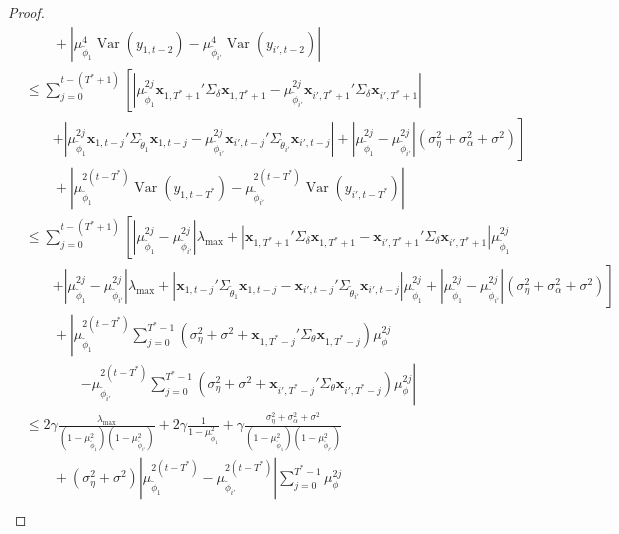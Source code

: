\documentclass[11pt]{article}
\newcommand{\x}{\textbf{x}}
\DeclareMathOperator{\Var}{Var} %
\theoremstyle{definition}
\begin{document}
\begin{proof}
\begin{align*}
   &\qquad + \left\vert \mu_{\tilde\phi_1}^4\Var(y_{1,t-2}) - \mu_{\tilde\phi_{i'}}^4\Var(y_{i',t-2}) \right\vert \\
   &\leq \sum_{j=0}^{t - (T^* + 1)}\left[ \left\vert \mu_{\tilde\phi_1}^{2j}\x_{1,T^*+1}'\Sigma_\delta\x_{1,T^*+1} - \mu_{\tilde\phi_{i'}}^{2j}\x_{i',T^*+1}'\Sigma_\delta\x_{i',T^*+1}\right\vert \right. \\
   &\qquad\left. + \left\vert \mu_{\tilde\phi_1}^{2j}\x_{1,t-j}'\Sigma_{\tilde\theta_1}\x_{1,t-j} - \mu_{\tilde\phi_{i'}}^{2j}\x_{i',t-j}'\Sigma_{\tilde\theta_{i'}}\x_{i',t-j} \right\vert + \left\vert\mu_{\tilde\phi_1}^{2j} - \mu_{\tilde\phi_{i'}}^{2j}\right\vert(\sigma^2_\eta + \sigma^2_{\alpha}+ \sigma^2)\right] \\
   &\qquad + \left\vert \mu_{\tilde\phi_1}^{2(t - T^*)}\Var(y_{1,t - T^*}) - \mu_{\tilde\phi_{i'}}^{2(t - T^*)}\Var(y_{i',t - T^*}) \right\vert \\
   &\leq \sum_{j=0}^{t - (T^* + 1)}\left[ \left\vert \mu_{\tilde\phi_1}^{2j} - \mu_{\tilde\phi_{i'}}^{2j}\right\vert \lambda_{\text{max}} +  \left\vert\x_{1,T^*+1}'\Sigma_\delta\x_{1,T^*+1} - \x_{i',T^*+1}'\Sigma_\delta\x_{i',T^*+1}\right\vert\mu_{\tilde\phi_1}^{2j} \right. \\
   &\qquad\left. + \left\vert \mu_{\tilde\phi_1}^{2j} - \mu_{\tilde\phi_{i'}}^{2j}\right\vert \lambda_{\text{max}} +  \left\vert\x_{1,t-j}'\Sigma_{\tilde\theta_1}\x_{1,t-j} - \x_{i',t-j}'\Sigma_{\tilde\theta_{i'}}\x_{i',t-j}\right\vert\mu_{\tilde\phi_1}^{2j} + \left\vert\mu_{\tilde\phi_1}^{2j} - \mu_{\tilde\phi_{i'}}^{2j}\right\vert(\sigma^2_\eta + \sigma^2_{\alpha}+ \sigma^2)\right] \\
   &\qquad + \left\vert \mu_{\tilde\phi_1}^{2(t - T^*)}\sum_{j=0}^{T^*-1}\left(\sigma^2_\eta + \sigma^2 + \x_{1,T^*-j}'\Sigma_\theta\x_{1,T^*-j}\right)\mu_{\phi}^{2j} \right. \\ 
   &\qquad\qquad\left. - \mu_{\tilde\phi_{i'}}^{2(t - T^*)}\sum_{j=0}^{T^*-1}\left(\sigma^2_\eta + \sigma^2 + \x_{i',T^*-j}'\Sigma_\theta\x_{i',T^*-j}\right)\mu_{\phi}^{2j} \right\vert \\
   &\leq 2\gamma\frac{\lambda_{\max}}{(1 - \mu_{\tilde\phi_1}^{2})(1 - \mu_{\tilde\phi_{i'}}^{2})} + 2\gamma\frac{1}{1 - \mu_{\tilde\phi_1}^2} + \gamma\frac{\sigma^2_\eta + \sigma^2_{\alpha}+ \sigma^2}{(1 - \mu_{\tilde\phi_1}^{2})(1 - \mu_{\tilde\phi_{i'}}^{2})} \\
   &\qquad+ (\sigma^2_\eta + \sigma^2)\left\vert \mu_{\tilde\phi_1}^{2(t - T^*)} - \mu_{\tilde\phi_{i'}}^{2(t - T^*)} \right\vert\sum_{j=0}^{T^*-1}\mu_{\phi}^{2j} \\

\end{align*}
\end{proof}
\end{document}
